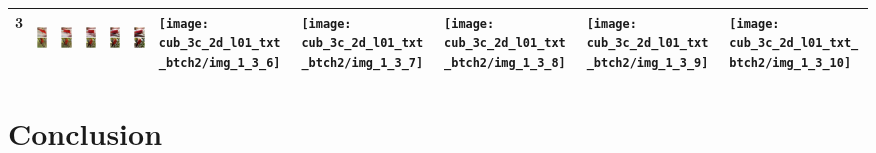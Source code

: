 \documentclass{article}
\begin{document}
\begin{table}[H]
\begin{tabularx}{\textwidth}{|c|X|X|X|X|X|X|X|X|X|X|}
3 & \includegraphics[keepaspectratio,height=50px]{cub_3c_2d_l01_txt_btch2/img_1_3_1} & \includegraphics[keepaspectratio,height=50px]{cub_3c_2d_l01_txt_btch2/img_1_3_2} & \includegraphics[keepaspectratio,height=50px]{cub_3c_2d_l01_txt_btch2/img_1_3_3} & \includegraphics[keepaspectratio,height=50px]{cub_3c_2d_l01_txt_btch2/img_1_3_4} & \includegraphics[keepaspectratio,height=50px]{cub_3c_2d_l01_txt_btch2/img_1_3_5} & \texttt{[image: cub\_3c\_2d\_l01\_txt\_btch2/img\_1\_3\_6]} & \texttt{[image: cub\_3c\_2d\_l01\_txt\_btch2/img\_1\_3\_7]} & \texttt{[image: cub\_3c\_2d\_l01\_txt\_btch2/img\_1\_3\_8]} & \texttt{[image: cub\_3c\_2d\_l01\_txt\_btch2/img\_1\_3\_9]} & \texttt{[image: cub\_3c\_2d\_l01\_txt\_btch2/img\_1\_3\_10]} \\\hline
\end{tabularx}
\end{table}
\section{Conclusion}

\printbibliography
\end{document}
